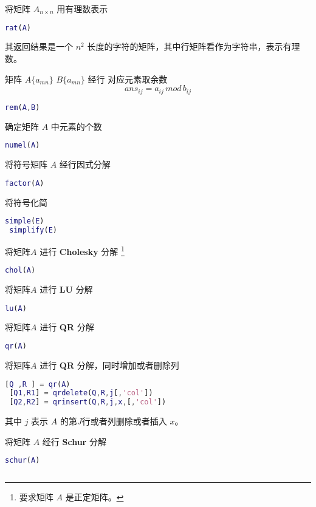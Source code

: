 \documentclass{ctexart}
\begin{document}
 将矩阵 $A_{n \times n}$ 用有理数表示
 \begin{lstlisting}[language=matlab]
 rat(A)
 \end{lstlisting}
 其返回结果是一个 $n^2$ 长度的字符的矩阵，其中行矩阵看作为字符串，表示有理数。
 
 矩阵 $A\{a_{mn}\}$ $B\{a_{mn}\}$ 经行 对应元素取余数
 $$ans_{ij} = a_{ij}\,mod\, b_{ij}$$
 \begin{lstlisting}[language=matlab]
 rem(A,B)
 \end{lstlisting}
 
 确定矩阵 $A$ 中元素的个数
 \begin{lstlisting}[language=matlab]
 numel(A)
 \end{lstlisting}
 
 将符号矩阵 $A$ 经行因式分解
 \begin{lstlisting}[language=matlab]
 factor(A)
 \end{lstlisting}
 
 将符号化简
 \begin{lstlisting}[language=matlab]
 simple(E)
 simplify(E)
 \end{lstlisting}
 
 将矩阵$A$ 进行 \textbf{Cholesky} 分解
 \footnote{要求矩阵 $A$ 是正定矩阵。}
 \begin{lstlisting}[language=matlab]
 chol(A)
 \end{lstlisting}
 
 将矩阵$A$ 进行 \textbf{LU} 分解
 \begin{lstlisting}[language=matlab]
 lu(A)
 \end{lstlisting}
 
 将矩阵$A$ 进行 \textbf{QR} 分解
 \begin{lstlisting}[language=matlab]
 qr(A)
 \end{lstlisting}
 
 将矩阵$A$ 进行 \textbf{QR} 分解，同时增加或者删除列
 \begin{lstlisting}[language=matlab]
 [Q ,R ] = qr(A)
 [Q1,R1] = qrdelete(Q,R,j[,'col'])
 [Q2,R2] = qrinsert(Q,R,j,x,[,'col'])
 \end{lstlisting}
 其中 $j$ 表示 $A$ 的第$J$行或者列删除或者插入 $x$。
 
 将矩阵 $A$ 经行 \textbf{Schur} 分解
 \begin{lstlisting}[language=matlab]
 schur(A)
 \end{lstlisting}







 \begin{lstlisting}[language=matlab]

 \end{lstlisting}
\end{document}
